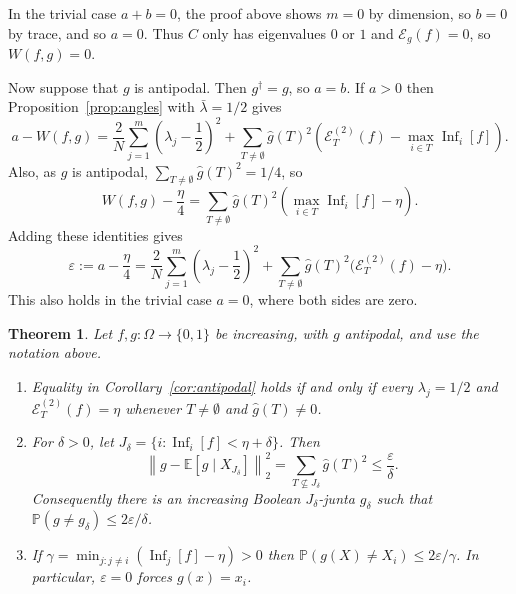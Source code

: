 \documentclass{article}
\theoremstyle{plain}
\newtheorem{theo}{Theorem}[section]
\theoremstyle{definition}
\newcommand{\mc}[1]{\mathcal{#1}}
\newcommand{\mb}[1]{\mathbb{#1}}
\newcommand{\sub}{\subseteq}
\newcommand{\eps}{\varepsilon}
\newcommand{\es}{\emptyset}
\newcommand{\lL}{\lambda}
\newcommand{\cE}{\mathcal E}
\newcommand{\OO}{\Omega}
\newcommand{\on}{\operatorname}
\begin{document}
In the trivial case $a+b=0$, the proof above shows $m=0$ by dimension, so $b=0$ by trace, and so $a=0$.
Thus $C$ only has eigenvalues $0$ or $1$ and $\mc E_g(f)=0$, so  $W(f,g)=0$.

Now suppose that $g$ is antipodal.  Then $g^\dagger=g$, so $a=b$.  If $a>0$ then Proposition~\ref{prop:angles} with $\bar\lambda=1/2$ gives
\[
 a-W(f,g)=\frac2N\sum_{j=1}^m\left(\lambda_j-\frac12\right)^2
 +\sum_{T\ne\es}\widehat g(T)^2\left(\cE_T^{(2)}(f)-\max_{i\in T}\on{Inf}_i[f]\right).
\]
Also, as $g$ is antipodal, $\sum_{T\ne\es}\widehat g(T)^2=1/4$, so
\[
 W(f,g)-\frac{\eta}{4}
 =\sum_{T\ne\es}\widehat g(T)^2\left(\max_{i\in T}\on{Inf}_i[f]-\eta\right).
\]
Adding these identities gives
\begin{equation}\label{eq:antipodal-deficit}
 \eps:=a-\frac{\eta}{4}
 =\frac2N\sum_{j=1}^m\left(\lambda_j-\frac12\right)^2
 +\sum_{T\ne\es}\widehat g(T)^2\bigl(\cE_T^{(2)}(f)-\eta\bigr).
\end{equation}
This also holds in the trivial case $a=0$, where both sides are zero.

\begin{theo}\label{thm:antipodal-stability}
Let $f,g:\OO\to\{0,1\}$ be increasing, with $g$ antipodal, and use the notation above.
\begin{enumerate}
\item Equality in Corollary~\ref{cor:antipodal} holds if and only if every $\lL_j=1/2$ and $\cE_T^{(2)}(f)=\eta$ whenever $T\ne\es$ and $\widehat g(T)\ne0$.
\item For $\delta>0$, let $J_\delta=\{i:\on{Inf}_i[f]<\eta+\delta\}$.  Then
\begin{equation}\label{eq:fourier-stability}
 \left\|g-\mb E[g\mid X_{J_\delta}]\right\|_2^2
 =\sum_{T\not\sub J_\delta}\widehat g(T)^2\le\frac{\eps}{\delta}.
\end{equation}
Consequently there is an increasing Boolean $J_\delta$-junta $g_\delta$ such that $\mb P(g\ne g_\delta)\le2\eps/\delta$.
\item If  $\gamma=\min_{j:j\ne i}(\on{Inf}_j[f]-\eta)>0$ then $\mb P(g(X)\ne X_i)\le2\eps/\gamma$. 
In particular, $\eps=0$ forces $g(x)=x_i$.
\end{enumerate}
\end{theo}
\end{document}
